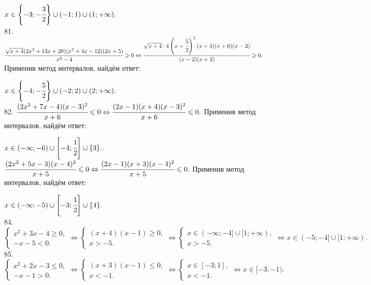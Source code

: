 \begin{figure}[ht!]
\end{figure}
$x\in\left\{-3;-\cfrac{3}{2}\right\}\cup(-1;1)\cup(1;+\infty).$\\
81. $\cfrac{\sqrt{x+4}(2x^2+13x+20)(x^2+4x-12)(2x+5)}{x^2-4}\geqslant0\Leftrightarrow \cfrac{\sqrt{x+4}\cdot4\left(x+\cfrac{5}{2}\right)^2(x+4)(x+6)(x-2)}{(x-2)(x+2)}\geqslant0.$ Применив метод интервалов, найдём ответ:
\begin{figure}[ht!]
\end{figure}
$x\in\left\{-4;-\cfrac{5}{2}\right\}\cup(-2;2)\cup(2;+\infty).$\\
82. $\cfrac{(2x^2+7x-4)(x-3)^2}{x+6}\leqslant0\Leftrightarrow\cfrac{(2x-1)(x+4)(x-3)^2}{x+6}\leqslant0.$
Применив метод интервалов, найдём ответ:
\begin{figure}[ht!]
\end{figure}
$x\in(-\infty;-6)\cup\left[-4;\cfrac{1}{2}\right]\cup\{3\}.$\newpage{}. $\cfrac{(2x^2+5x-3)(x-4)^2}{x+5}\leqslant0\Leftrightarrow\cfrac{(2x-1)(x+3)(x-4)^2}{x+5}\leqslant0.$
Применив метод интервалов, найдём ответ:
\begin{figure}[ht!]
\end{figure}
$x\in(-\infty;-5)\cup\left[-3;\cfrac{1}{2}\right]\cup\{4\}.$\\
84. $\begin{cases} x^2+3x-4\geqslant0,\\ -x-5<0.\end{cases}\Leftrightarrow \begin{cases} (x+4)(x-1)\geqslant0,\\ x>-5.\end{cases}
\Leftrightarrow \begin{cases} x\in(-\infty;-4]\cup[1;+\infty),\\ x>-5.\end{cases}\Leftrightarrow x\in(-5;-4]\cup[1;+\infty).$\\
85. $\begin{cases} x^2+2x-3\leqslant0,\\ -x-1>0.\end{cases} \Leftrightarrow\begin{cases} (x+3)(x-1)\leqslant0,\\ x<-1.\end{cases}
\Leftrightarrow\begin{cases} x\in[-3;1],\\ x<-1.\end{cases}\Leftrightarrow x\in[-3;-1).$\\
